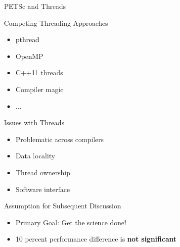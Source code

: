 
\begin{frame}[fragile]{PETSc and Threads}

 \begin{block}{Competing Threading Approaches}
  \begin{itemize}
   \item pthread
   \item OpenMP
   \item C++11 threads
   \item Compiler magic
   \item ...
  \end{itemize}
 \end{block}

 \begin{block}{Issues with Threads}
  \begin{itemize}
   \item Problematic across compilers
   \item Data locality
   \item Thread ownership
   \item Software interface
  \end{itemize}
 \end{block}

  \begin{block}{Assumption for Subsequent Discussion}
  \begin{itemize}
   \item Primary Goal: Get the science done!
   \item 10 percent performance difference is \textbf{not significant}
  \end{itemize}
 \end{block}


\end{frame}


